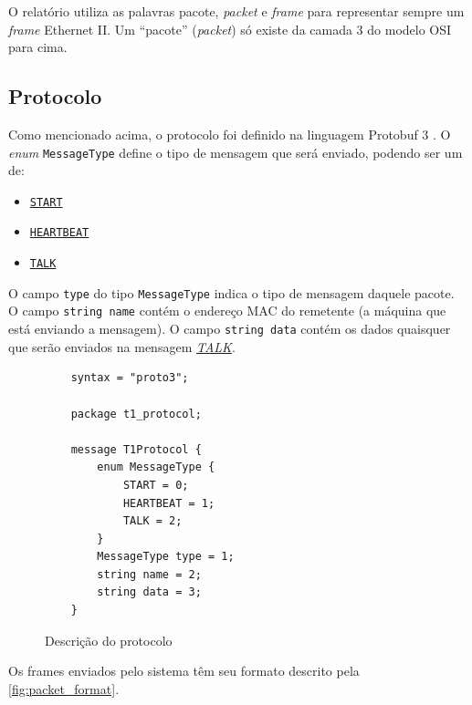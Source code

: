 O relatório utiliza as palavras pacote, \textit{packet} e \textit{frame} para representar sempre um \textit{frame} Ethernet II.
Um ``pacote'' (\textit{packet}) só existe da camada 3 do modelo OSI \cite{osi_model} para cima.

\subsection{Protocolo}
\label{sec:protocolo}

Como mencionado acima, o protocolo foi definido na linguagem Protobuf 3 \cite{protobuf}.
O \textit{enum} \lstinline{MessageType} define o tipo de mensagem que será enviado, podendo ser um de:

\begin{itemize}
    \item \hyperlink{proto_start}{\lstinline{START}}
    \item \hyperlink{proto_heartbeat}{\lstinline{HEARTBEAT}}
    \item \hyperlink{proto_talk}{\lstinline{TALK}}
\end{itemize}

O campo \lstinline{type} do tipo \lstinline{MessageType} indica o tipo de mensagem daquele pacote.
O campo \lstinline{string name} contém o endereço MAC do remetente (a máquina que está enviando a mensagem).
O campo \lstinline{string data} contém os dados quaisquer que serão enviados na mensagem \hyperlink{proto_talk}{\textit{TALK}}.

\begin{figure}[H]
    \centering
\begin{verbatim}
    syntax = "proto3";
    
    package t1_protocol;
    
    message T1Protocol {
        enum MessageType {
            START = 0;
            HEARTBEAT = 1;
            TALK = 2;
        }
        MessageType type = 1;
        string name = 2;
        string data = 3;
    }
\end{verbatim}
    \caption{Descrição do protocolo}
    \label{fig:protobuf_desc}
\end{figure}

Os frames enviados pelo sistema têm seu formato descrito pela \figurename{ \ref{fig:packet_format}}.


